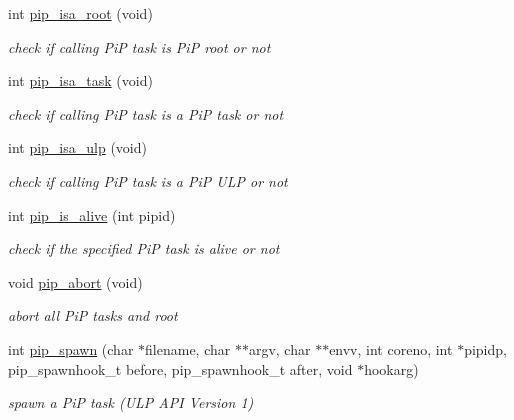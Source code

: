 \begin{DoxyCompactItemize}
\item 
int \hyperlink{group__libpip_ga6f1045bdbf682cb2ac504f09b57b73e9}{pip\-\_\-isa\-\_\-root} (void)
\begin{DoxyCompactList}\small\item\em check if calling Pi\-P task is Pi\-P root or not \end{DoxyCompactList}\end{DoxyCompactItemize}
\begin{DoxyCompactItemize}
\item 
int \hyperlink{group__libpip_gaf0283e47ad2d415206d6a3fa61e8a0a9}{pip\-\_\-isa\-\_\-task} (void)
\begin{DoxyCompactList}\small\item\em check if calling Pi\-P task is a Pi\-P task or not \end{DoxyCompactList}\end{DoxyCompactItemize}
\begin{DoxyCompactItemize}
\item 
int \hyperlink{group__libpip_gafc11d79f0f63c4c57ccb5c3bb2803241}{pip\-\_\-isa\-\_\-ulp} (void)
\begin{DoxyCompactList}\small\item\em check if calling Pi\-P task is a Pi\-P U\-L\-P or not \end{DoxyCompactList}\end{DoxyCompactItemize}
\begin{DoxyCompactItemize}
\item 
int \hyperlink{group__libpip_gacefb1f29e5f5d9b21309a1d041e78790}{pip\-\_\-is\-\_\-alive} (int pipid)
\begin{DoxyCompactList}\small\item\em check if the specified Pi\-P task is alive or not \end{DoxyCompactList}\end{DoxyCompactItemize}
\begin{DoxyCompactItemize}
\item 
void \hyperlink{group__libpip_ga49a4a9ee014ffdaf0c26df18adf965ad}{pip\-\_\-abort} (void)
\begin{DoxyCompactList}\small\item\em abort all Pi\-P tasks and root \end{DoxyCompactList}\end{DoxyCompactItemize}
\begin{DoxyCompactItemize}
\item 
int \hyperlink{group__libpip_gae9187ea22ecf0623fa3ecfba5337f52d}{pip\-\_\-spawn} (char $\ast$filename, char $\ast$$\ast$argv, char $\ast$$\ast$envv, int coreno, int $\ast$pipidp, pip\-\_\-spawnhook\-\_\-t before, pip\-\_\-spawnhook\-\_\-t after, void $\ast$hookarg)
\begin{DoxyCompactList}\small\item\em spawn a Pi\-P task (U\-L\-P A\-P\-I Version 1) \end{DoxyCompactList}\end{DoxyCompactItemize}


